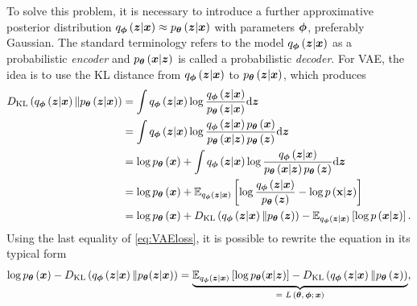 To solve this problem, it is necessary to introduce a further approximative posterior distribution $q_{\boldsymbol{\phi}}\left(\boldsymbol{z}\vert\boldsymbol{x}\right) \approx p_{\boldsymbol{\theta}}\left(\boldsymbol{z}\vert\boldsymbol{x}\right)$ with parameters $\boldsymbol{\phi}$, preferably Gaussian. The standard terminology refers to the model $q_{\boldsymbol{\phi}}\left(\boldsymbol{z}\vert\boldsymbol{x}\right)$ as a probabilistic \emph{encoder} and  $p_{\boldsymbol{\theta}}\left(\boldsymbol{x}\vert \boldsymbol{z}\right)$ is called a probabilistic \emph{decoder}. For VAE, the idea is to use the KL distance from $q_{\boldsymbol{\phi}}\left(\boldsymbol{z}\vert\boldsymbol{x}\right)$ to $p_{\boldsymbol{\theta}}\left(\boldsymbol{z}\vert \boldsymbol{x}\right)$, which produces
\begin{equation}\label{eq:VAEloss}
\begin{split}
D_{\mathrm{KL}}\left(q_{\boldsymbol{\phi}}\left(\boldsymbol{z}\vert \boldsymbol{x} \right) \Vert p_{\boldsymbol{\theta}}\left(\boldsymbol{z}\vert \boldsymbol{x}\right)\right) & = 
\int q_{\boldsymbol{\phi}}\left(\boldsymbol{z}\vert \boldsymbol{x} \right) \log \frac{q_{\boldsymbol{\phi}}\left(\boldsymbol{z}\vert \boldsymbol{x} \right)}{p_{\boldsymbol{\theta}}\left(\boldsymbol{z}\vert \boldsymbol{x}\right)} \mathrm{d}{\boldsymbol{z}} \\
& =  \int q_{\boldsymbol{\phi}}\left(\boldsymbol{z}\vert \boldsymbol{x} \right) \log \frac{q_{\boldsymbol{\phi}}\left(\boldsymbol{z}\vert \boldsymbol{x} \right)p_{\boldsymbol{\theta}}\left(\boldsymbol{x}\right)}{p_{\boldsymbol{\theta}}\left(\boldsymbol{x} \vert \boldsymbol{z}\right) p_{\boldsymbol{\theta}}\left(\boldsymbol{z}\right)} \mathrm{d}{\boldsymbol{z}} \\
& = \log p_{\boldsymbol{\theta}}\left(\boldsymbol{x}\right) +  \int q_{\boldsymbol{\phi}}\left(\boldsymbol{z}\vert \boldsymbol{x} \right) \log \frac{q_{\boldsymbol{\phi}}\left(\boldsymbol{z}\vert \boldsymbol{x} \right)}{p_{\boldsymbol{\theta}}\left(\boldsymbol{x} \vert \boldsymbol{z}\right)p_{\boldsymbol{\theta}}\left(\boldsymbol{z}\right) } \mathrm{d}{\boldsymbol{z}} \\
& = \log p_{\boldsymbol{\theta}}\left(\boldsymbol{x}\right) +  \mathbb{E}_{q_{\boldsymbol{\phi}}\left(\boldsymbol{z}\vert \boldsymbol{x} \right)}\left[\log\frac{q_{\boldsymbol{\phi}}\left(\boldsymbol{z}\vert \boldsymbol{x} \right)}{p_{\boldsymbol{\theta}}\left(\boldsymbol{z}\right)} - \log p\left(\textbf{x}\vert \boldsymbol{z}\right)\right]\\
    & = \log p_{\boldsymbol{\theta}}\left(\boldsymbol{x}\right) +D_{\mathrm{KL}} \left(q_{\boldsymbol{\phi}}\left(\boldsymbol{z}\vert \boldsymbol{x} \right) \Vert p_{\boldsymbol{\theta}}\left(\boldsymbol{z}\right) \right) -  \mathbb{E}_{q_{\boldsymbol{\phi}}\left(\boldsymbol{z}\vert \boldsymbol{x} \right)}\left[\log p\left(\boldsymbol{x}\vert \boldsymbol{z}\right)\right].
 \end{split}
\end{equation}
Using the last equality of \eqref{eq:VAEloss}, it is possible to rewrite the equation in its typical form
\begin{equation}
\log p_{\boldsymbol{\theta}}\left(\boldsymbol{x}\right) - D_{\mathrm{KL}}\left(q_{\boldsymbol{\phi}}\left(\boldsymbol{z}\vert \boldsymbol{x} \right) \Vert p_{\boldsymbol{\theta}}(\boldsymbol{z}\vert \boldsymbol{x})\right) = \underbrace{\mathbb{E}_{q_{\boldsymbol{\phi}}\left(\boldsymbol{z}\vert \boldsymbol{x} \right)}\left[\log p_{\boldsymbol{\theta}}(\boldsymbol{x}\vert \boldsymbol{z}) \right] - D_{\mathrm{KL}}\left(q_{\boldsymbol{\phi}}\left(\boldsymbol{z}\vert\boldsymbol{x} \right) \Vert p_{\boldsymbol{\theta}}\left(\boldsymbol{z}\right)\right)}_{\text{= $L\left(\boldsymbol{\theta},\boldsymbol{\phi}; \boldsymbol{x}\right)$}},
\end{equation}
